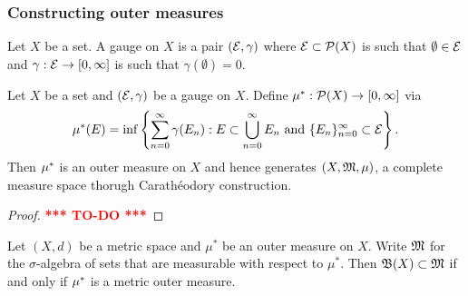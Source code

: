 \documentclass[a4paper]{article}
\newcommand{\TODO}{\textcolor{red}{\textbf{*** TO-DO ***}}}
\renewcommand{\cupinfn}{\bigcup_{n=0}^\infty}
\renewcommand{\suminfn}{\sum_{n=0}^\infty}
\renewcommand{\seqinfn}[1]{\{ #1 \}_{n=0}^\infty}
\begin{document}
\subsubsection{Constructing outer measures}

\begin{defi}
  Let $X$ be a set. A gauge on $X$ is a pair $(\mathcal{E}, \gamma)$
  where $\mathcal{E} \subset \mathcal{P}(X)$ is such that $\emptyset
  \in \mathcal{E}$ and $\gamma : \mathcal{E} \to [0, \infty]$
  is such that $\gamma(\emptyset) = 0$.
\end{defi}

\begin{thm}
  Let $X$ be a set and $(\mathcal{E}, \gamma)$ be a gauge on $X$.
  Define $\mu^*: \mathcal{P}(X) \to [0, \infty]$ via
  \[
  \om(E) = \inf \left\{ \suminfn \gamma(E_n):
  E \subset \cupinfn E_n \text{ and }
  \seqinfn{E_n} \subset \ecal \right\}.
  \]
  Then $\mu^*$ is an outer measure on $X$ and hence
  generates $(X, \mathfrak{M}, \mu)$, a complete measure space
  thorugh Carath\'eodory construction.
\end{thm}

\begin{proof}
  \TODO
\end{proof}

\begin{thm}
Let $(X,d)$ be a metric space and $\mu^*$ be an outer 
measure on $X$. Write $\mathfrak{M}$ for the $\sigma$-algebra of 
sets that are measurable with respect to $\mu^*$. Then 
$\mathfrak{B}(X) \subset \mathfrak{M}$ if and only if $\mu^*$ is a metric 
outer measure.
\end{thm}
\end{document}
